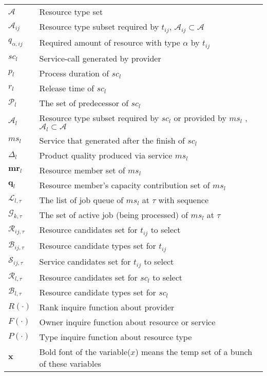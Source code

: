 \begin{table}[htbp]
\begin{tabularx}{\textwidth}{|lX|}
	$\mathcal{A}$ & Resource type set \\
	$\mathcal{A}_{ij}$ & Resource type subset required by $t_{ij}$, $\mathcal{A}_{ij}\subset\mathcal{A}$\\
	$q_{\alpha,ij}$ & Required amount of resource with type $\alpha$ by $t_{ij}$\\
	$sc_l$ & Service-call generated by provider\\
	$p_l$ & Process duration of $sc_l$\\
	$r_l$ & Release time of $sc_l$\\
	$\mathcal{P}_{l}$ & The set of predecessor of $sc_{l}$\\
	$\mathcal{A}_l$ & Resource type subset required by $sc_l$ or provided by $ms_l$ , $\mathcal{A}_l\subset\mathcal{A}$\\
	$ms_l$ & Service that generated after the finish of $sc_l$\\
	$\Delta_l$ & Product quality produced via service $ms_l$\\
	$\bm{mr}_l$ & Resource member set of $ms_l$\\
	$\bm{q}_l$ & Resource member's capacity contribution set of $ms_l$\\
	$\mathcal{L}_{l,\tau}$ & The list of job queue of $ms_l$ at $\tau$ with sequence\\
	$\mathcal{G}_{k,\tau}$ & The set of active job (being processed) of $ms_l$ at $\tau$ \\
	$\mathcal{R}_{ij,\tau}$ & Resource candidates set for $t_{ij}$ to select\\
	$\mathcal{B}_{ij,\tau}$ & Resource candidate types set for $t_{ij}$\\
	$\mathcal{S}_{ij,\tau}$ & Service candidates set for $t_{ij}$ to select\\
	$\mathcal{R}_{l,\tau}$ & Resource candidates set for $sc_l$ to select\\
	$\mathcal{B}_{l,\tau}$ & Resource candidate types set for $sc_l$\\
	$R(\cdot)$ & Rank inquire function about provider\\
	$F(\cdot)$ & Owner inquire function about resource or service\\
	$P(\cdot)$ & Type inquire function about resource type\\
	$\bm{x}$ & Bold font of the variable($x$) means the temp set of a bunch of these variables\\
    \hline
\end{tabularx}
\end{table}

